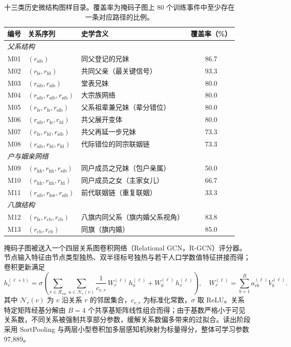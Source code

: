 \begin{table}[ht]
  \centering
  \caption{十三类历史微结构图样目录。覆盖率为掩码子图上 80 个训练事件中至少存在一条对应路径的比例。}\label{tab:motif-catalog}
  \begin{tabular}{c l l c}
    \toprule
    编号 & 关系序列 & 史学含义 & 覆盖率（\%）\\
    \midrule
    \multicolumn{4}{l}{\emph{父系结构}}\\
    M01 & $(r_\mathrm{sib})$ & 同父登记的兄妹 & 86.7 \\
    M02 & $(r_\mathrm{fs},r_\mathrm{fd})$ & 共同父亲（最关键信号） & 93.3 \\
    M03 & $(r_\mathrm{sib},r_\mathrm{sib})$ & 堂表兄妹 & 80.0 \\
    M04 & $(r_\mathrm{sib},r_\mathrm{sib},r_\mathrm{sib})$ & 大宗族网络 & 80.0 \\
    M05 & $(r_\mathrm{fs},r_\mathrm{fs},r_\mathrm{sib})$ & 父系祖辈兼兄妹（辈分错位） & 80.0 \\
    M06 & $(r_\mathrm{sib},r_\mathrm{fs},r_\mathrm{fd})$ & 共父展开变体 & 80.0 \\
    M07 & $(r_\mathrm{fs},r_\mathrm{fd},r_\mathrm{sib})$ & 共父再延一步兄妹 & 73.3 \\
    M08 & $(r_\mathrm{sib},r_\mathrm{fd},r_\mathrm{fd})$ & 代际错位的同宗联姻链 & 73.3 \\
    \multicolumn{4}{l}{\emph{户与姻亲网络}}\\
    M09 & $(r_\mathrm{hh},r_\mathrm{hh},r_\mathrm{sib})$ & 同户成员之兄妹（包户亲属） & 50.0 \\
    M10 & $(r_\mathrm{hh},r_\mathrm{hh},r_\mathrm{fd})$ & 同户成员之女（主家女儿） & 66.7 \\
    M11 & $(r_\mathrm{sib},r_\mathrm{hw},r_\mathrm{sib})$ & 前代联姻链（重复联姻） & 33.3 \\
    \multicolumn{4}{l}{\emph{八旗结构}}\\
    M12 & $(r_\mathrm{fs},r_\mathrm{cb},r_\mathrm{cb})$ & 八旗内同父系（旗内婚父系视角） & 83.8 \\
    M13 & $(r_\mathrm{cb},r_\mathrm{cb})$ & 同旗（旗内婚） & 85.0 \\
    \bottomrule
  \end{tabular}
\end{table}

掩码子图被送入一个四层关系图卷积网络（Relational GCN，R-GCN）评分器。节点输入特征由节点类型独热、双半径标号独热与若干人口学数值特征拼接而得；卷积更新满足
\begin{equation}\label{eq:rgcn-update}
h_v^{(\ell+1)}=\sigma\!\left(\sum_{r\in\mathcal{R}_\mathrm{vis}}\sum_{u\in\mathcal{N}_r(v)}\frac{1}{c_{v,r}}\,W_r^{(\ell)}\,h_u^{(\ell)}+W_0^{(\ell)}\,h_v^{(\ell)}\right),\quad W_r^{(\ell)}=\sum_{b=1}^{B}a_{rb}^{(\ell)}V_b^{(\ell)}.
\end{equation}
其中 \(\mathcal{N}_r(v)\) 为 \(v\) 沿关系 \(r\) 的邻居集合，\(c_{v,r}\) 为标准化常数，\(\sigma\) 取 ReLU。关系特定矩阵经基分解由 \(B=4\) 个共享基矩阵线性组合而得；由于基数严格小于可见关系数，不同关系被强制共享部分参数，缓解关系数偏多带来的过拟合。读出阶段采用 SortPooling 与两层小型卷积加多层感知机映射为标量得分，整体可学习参数 97{,}889。

